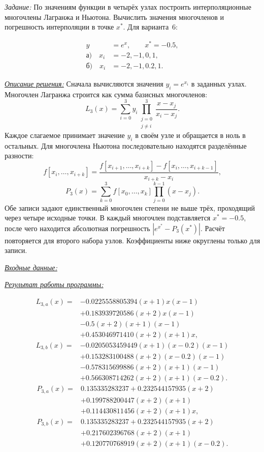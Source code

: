 \documentclass[a4paper,12pt]{article}
\newcommand{\labheading}[1]{\clearpage\noindent\hspace*{\parindent}{\fontsize{16}{19}\selectfont\bfseries Лабораторная работа № #1}\par\vspace{11pt}}
\newcommand{\task}[1]{\indent\textit{Задание:} #1\par}
\newcommand{\solution}[1]{\par\vspace{9pt}\indent\underline{\textit{Описание решения:}} #1}
\newcommand{\blocktitle}[1]{\par\Needspace{4\baselineskip}\vspace{9pt}\indent\underline{\textit{#1}}\par\vspace{4pt}}
\begin{document}
\labheading{3.1}
\task{По значениям функции в четырёх узлах построить
интерполяционные многочлены Лагранжа и Ньютона. Вычислить
значения многочленов и погрешность интерполяции в точке $x^*$.
Для варианта~6:}
\[
\begin{aligned}
y&=e^x,\qquad x^*=-0.5,\\
\text{а)}\quad x_i&=-2,-1,0,1,\\
\text{б)}\quad x_i&=-2,-1,0.2,1.
\end{aligned}
\]
\solution{}
Сначала вычисляются значения $y_i=e^{x_i}$ в заданных узлах.
Многочлен Лагранжа строится как сумма базисных многочленов:
\[
L_3(x)=\sum_{i=0}^{3}y_i\prod_{\substack{j=0\\j\ne i}}^{3}
\frac{x-x_j}{x_i-x_j}.
\]
Каждое слагаемое принимает значение $y_i$ в своём узле и
обращается в ноль в остальных. Для многочлена Ньютона
последовательно находятся разделённые разности:
\[
f[x_i,\ldots,x_{i+k}]=
\frac{f[x_{i+1},\ldots,x_{i+k}]-f[x_i,\ldots,x_{i+k-1}]}
{x_{i+k}-x_i},
\]
\[
P_3(x)=\sum_{k=0}^{3}f[x_0,\ldots,x_k]
\prod_{j=0}^{k-1}(x-x_j).
\]
Обе записи задают единственный многочлен степени не выше трёх,
проходящий через четыре исходные точки. В каждый многочлен
подставляется $x^*=-0.5$, после чего находится абсолютная
погрешность $|e^{x^*}-P_3(x^*)|$. Расчёт повторяется для второго
набора узлов. Коэффициенты ниже округлены только для записи.
\blocktitle{Входные данные:}
\clearpage
\blocktitle{Результат работы программы:}
\begin{align*}
L_{3,a}(x)={}&-0.0225558805394(x+1)x(x-1)\\
&+0.183939720586(x+2)x(x-1)\\
&-0.5(x+2)(x+1)(x-1)\\
&+0.453046971410(x+2)(x+1)x,\\
L_{3,b}(x)={}&-0.0205053459449(x+1)(x-0.2)(x-1)\\
&+0.153283100488(x+2)(x-0.2)(x-1)\\
&-0.578315699886(x+2)(x+1)(x-1)\\
&+0.566308714262(x+2)(x+1)(x-0.2).
\end{align*}
\begin{align*}
P_{3,a}(x)={}&0.135335283237+0.232544157935(x+2)\\
&+0.199788200447(x+2)(x+1)\\
&+0.114430811456(x+2)(x+1)x,\\
P_{3,b}(x)={}&0.135335283237+0.232544157935(x+2)\\
&+0.217602396768(x+2)(x+1)\\
&+0.120770768919(x+2)(x+1)(x-0.2).
\end{align*}
\end{document}
